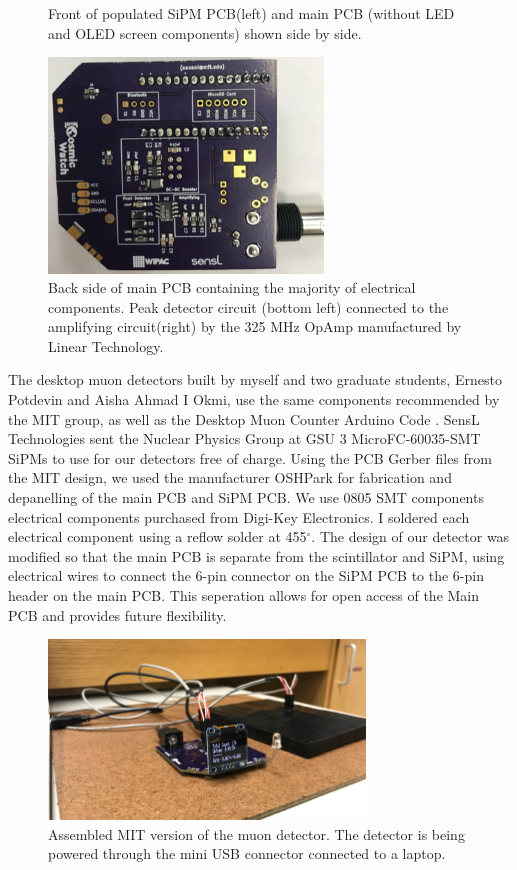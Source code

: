 \begin{itemize}
\begin{figure}[htb]
\caption{Front of populated SiPM PCB(left) and main PCB (without LED and OLED screen components) shown side by side.}
\label{MIT_MainSiPMPCB_POP}
\end{figure}
\begin{figure}[htb]
\centering
\includegraphics[width=0.65\textwidth]{images/MITMainPCBPOP.png} 
\caption{Back side of main PCB containing the majority of electrical components. Peak detector circuit (bottom left) connected to the amplifying circuit(right) by the 325 MHz OpAmp manufactured by Linear Technology.}
\label{MIT_mainPCB_POP}
\end{figure}


\end{itemize}

The desktop muon detectors built by myself and two graduate students, Ernesto Potdevin and Aisha Ahmad I Okmi, use the same components recommended by the MIT group, as well as the Desktop Muon Counter Arduino Code \cite{MIT_Code}. SensL Technologies sent the Nuclear Physics Group at GSU 3 MicroFC-60035-SMT SiPMs to use for our detectors free of charge. Using the PCB Gerber files from the MIT design, we used the manufacturer OSHPark for fabrication and depanelling of the main PCB and SiPM PCB. We use 0805 SMT components electrical components purchased from Digi-Key Electronics. I soldered each electrical component using a reflow solder at 455$^{\circ}$. The design of our detector was modified so that the main PCB is separate from the scintillator and SiPM, using electrical wires to connect the 6-pin connector on the SiPM PCB to the 6-pin header on the main PCB. This seperation allows for open access of the Main PCB and provides future flexibility. 
\begin{figure}[htb]
\centering
\includegraphics[width=0.75\textwidth]{images/FinalDetector_Setup.png} 
\caption{Assembled MIT version of the muon detector. The detector is being powered through the mini USB connector connected to a laptop.}
\label{MIT_WrappedScintillator}
\end{figure}


